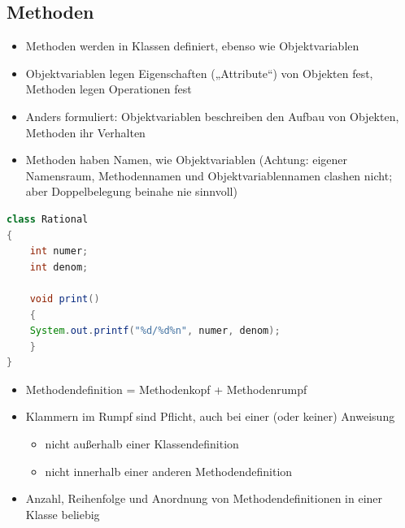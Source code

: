 \subsection{Methoden}
\begin{itemize}
\item Methoden werden in Klassen definiert, ebenso wie Objektvariablen
\item  Objektvariablen legen Eigenschaften („Attribute“) von Objekten fest, Methoden legen Operationen fest
\item  Anders formuliert: Objektvariablen beschreiben den Aufbau von Objekten, Methoden ihr Verhalten
\item Methoden haben Namen, wie Objektvariablen (Achtung: eigener
Namensraum, Methodennamen und Objektvariablennamen clashen
nicht; aber Doppelbelegung beinahe nie sinnvoll)
\end{itemize}
 \begin{lstlisting}[language=JAVA]
class Rational
{
	int numer;
	int denom;
	
	void print()
	{
	System.out.printf("%d/%d%n", numer, denom);
	}
}
 \end{lstlisting}
 \begin{itemize}
 \item Methodendefinition = Methodenkopf + Methodenrumpf
 \item Klammern im Rumpf sind Pflicht, auch bei einer (oder keiner) Anweisung
 \begin{itemize}
 	\item nicht außerhalb einer Klassendefinition
 	\item nicht innerhalb einer anderen Methodendefinition
\end{itemize}
\item Anzahl, Reihenfolge und Anordnung von Methodendefinitionen in einer Klasse beliebig
\end{itemize}
